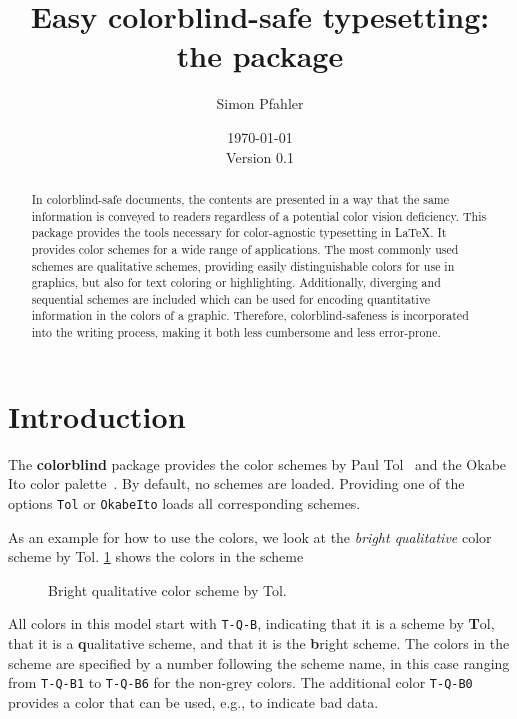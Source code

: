 \documentclass{scrartcl}
\title{Easy colorblind-safe typesetting:\\ the \colorblind package}
\author{Simon Pfahler}
\date{\today\\Version 0.1}
\newcommand\colorblind{\textbf{colorblind} }
\newcommand\marg[1]{\leavevmode\marginpar{\raggedleft #1}}
\begin{document}
\maketitle

\begin{abstract}
    In colorblind-safe documents, the contents are presented in a way that the same information is conveyed to readers regardless of a potential color vision deficiency.
    This package provides the tools necessary for color-agnostic typesetting in \LaTeX.
    It provides color schemes for a wide range of applications.
    The most commonly used schemes are qualitative schemes, providing easily distinguishable colors for use in graphics, but also for text coloring or highlighting.
    Additionally, diverging and sequential schemes are included which can be used for encoding quantitative information in the colors of a graphic.
    Therefore, colorblind-safeness is incorporated into the writing process, making it both less cumbersome and less error-prone.
\end{abstract}

\tableofcontents
\clearpage

\section{Introduction}
\cprotect\marg{\verb!Tol!\\\verb!OkabeIto!}%
The \colorblind package provides the color schemes by Paul Tol~\cite{Tol} and the Okabe Ito color palette~\cite{Ichihara_2008}.
By default, no schemes are loaded.
Providing one of the options \verb!Tol! or \verb!OkabeIto! loads all corresponding schemes.

As an example for how to use the colors, we look at the \emph{bright qualitative} color scheme by Tol.
\cref{fig:T-Q-Bexample} shows the colors in the scheme

\begin{figure}[ht]
    \centering
    \caption{Bright qualitative color scheme by Tol.}
    \label{fig:T-Q-Bexample}
\end{figure}

All colors in this model start with \verb!T-Q-B!, indicating that it is a scheme by \textbf{T}ol, that it is a \textbf{q}ualitative scheme, and that it is the \textbf{b}right scheme.
The colors in the scheme are specified by a number following the scheme name, in this case ranging from \verb!T-Q-B1! to \verb!T-Q-B6! for the non-grey colors.
The additional color \verb!T-Q-B0! provides a color that can be used, e.g., to indicate bad data.
\end{document}
